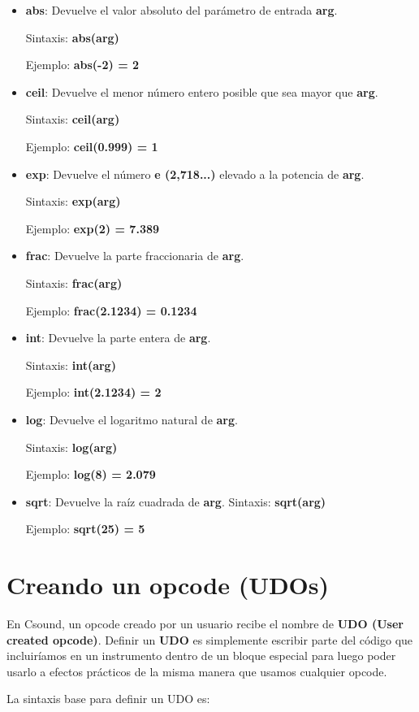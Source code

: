 \begin{itemize}
 \item \textbf{abs}: Devuelve el valor absoluto del parámetro de entrada \textbf{arg}. 
 
 Sintaxis: \textbf{abs(arg)}
 
 Ejemplo: \textbf{abs(-2) = 2}
 \item \textbf{ceil}: Devuelve el menor número entero posible que sea mayor que \textbf{arg}.
 
 Sintaxis: \textbf{ceil(arg)}
 
 Ejemplo: \textbf{ceil(0.999) = 1}
 \item \textbf{exp}: Devuelve el número \textbf{e (2,718...)} elevado a la potencia de \textbf{arg}.
 
 Sintaxis: \textbf{exp(arg)}
 
 Ejemplo: \textbf{exp(2) = 7.389}
 \item \textbf{frac}: Devuelve la parte fraccionaria de \textbf{arg}.
 
 Sintaxis: \textbf{frac(arg)}
 
 Ejemplo: \textbf{frac(2.1234) = 0.1234}
 \item \textbf{int}: Devuelve la parte entera de \textbf{arg}.
 
 Sintaxis: \textbf{int(arg)}
 
 Ejemplo: \textbf{int(2.1234) = 2}
 \item \textbf{log}: Devuelve el logaritmo natural de \textbf{arg}.
 
 Sintaxis: \textbf{log(arg)}
 
 Ejemplo: \textbf{log(8) = 2.079}
 \item \textbf{sqrt}: Devuelve la raíz cuadrada de \textbf{arg}.
 Sintaxis: \textbf{sqrt(arg)}
 
 Ejemplo: \textbf{sqrt(25) = 5}
\end{itemize}

\section{Creando un opcode (UDOs)}

En Csound, un opcode creado por un usuario recibe el nombre de \textbf{UDO (User created opcode)}. Definir un \textbf{UDO} es simplemente escribir parte del código que incluiríamos en un instrumento dentro de un bloque especial para luego poder usarlo a efectos prácticos de la misma manera que usamos cualquier opcode.

La sintaxis base para definir un UDO es:


